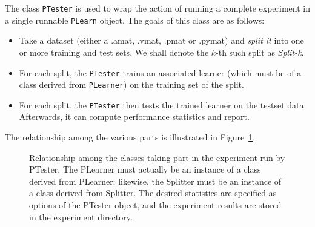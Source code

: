 \documentclass[11pt]{book}
\begin{document}
The class \verb|PTester| is used to wrap the action of running a complete
experiment in a single runnable \verb|PLearn| object.  The goals of this
class are as follows:

  \begin{itemize}
  \item Take a dataset (either a .amat, .vmat, .pmat or .pymat) and
    \emph{split it} into one or more training and test sets.  We shall
    denote the $k$-th such split as \emph{Split-k}.

  \item For each split, the \verb|PTester| trains an associated learner
    (which must be of a class derived from \verb|PLearner|) on the training
    set of the split.

  \item For each split, the \verb|PTester| then tests the trained learner
    on the testset data.  Afterwards, it can compute performance statistics
    and report.
  \end{itemize}

The relationship among the various parts is illustrated in
Figure~\ref{fig:ptesteroverall}.

\begin{figure}
  \centering
  \caption{Relationship among the classes taking part in the experiment run
    by PTester.  The PLearner must actually be an instance of a class
    derived from PLearner; likewise, the Splitter must be an instance of a
    class derived from Splitter.  The desired statistics are specified as
    options of the PTester object, and the experiment results are stored in
    the experiment directory.}
\label{fig:ptesteroverall}
\end{figure}
\end{document}
